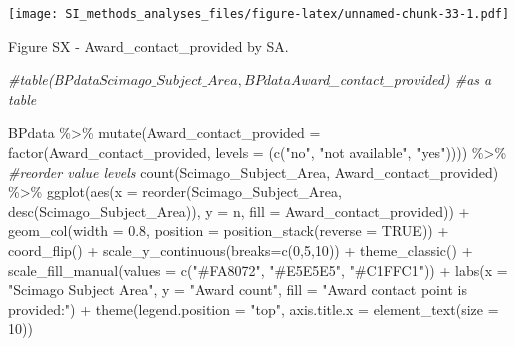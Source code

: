 \documentclass[
]{article}
\newenvironment{Shaded}{\begin{snugshade}}{\end{snugshade}}
\newcommand{\AttributeTok}[1]{\textcolor[rgb]{0.77,0.63,0.00}{#1}}
\newcommand{\CommentTok}[1]{\textcolor[rgb]{0.56,0.35,0.01}{\textit{#1}}}
\newcommand{\ConstantTok}[1]{\textcolor[rgb]{0.00,0.00,0.00}{#1}}
\newcommand{\DecValTok}[1]{\textcolor[rgb]{0.00,0.00,0.81}{#1}}
\newcommand{\FloatTok}[1]{\textcolor[rgb]{0.00,0.00,0.81}{#1}}
\newcommand{\FunctionTok}[1]{\textcolor[rgb]{0.00,0.00,0.00}{#1}}
\newcommand{\NormalTok}[1]{#1}
\newcommand{\SpecialCharTok}[1]{\textcolor[rgb]{0.00,0.00,0.00}{#1}}
\newcommand{\StringTok}[1]{\textcolor[rgb]{0.31,0.60,0.02}{#1}}
\begin{document}
\texttt{[image: SI\_methods\_analyses\_files/figure-latex/unnamed-chunk-33-1.pdf]}

Figure SX - Award\_contact\_provided by SA.

\begin{Shaded}
\begin{Highlighting}[]
\CommentTok{\#table(BPdata$Scimago\_Subject\_Area, BPdata$Award\_contact\_provided) \#as a table}

\NormalTok{BPdata }\SpecialCharTok{\%\textgreater{}\%} 
    \FunctionTok{mutate}\NormalTok{(}\AttributeTok{Award\_contact\_provided =} \FunctionTok{factor}\NormalTok{(Award\_contact\_provided, }\AttributeTok{levels =}\NormalTok{ (}\FunctionTok{c}\NormalTok{(}\StringTok{"no"}\NormalTok{, }\StringTok{"not available"}\NormalTok{, }\StringTok{"yes"}\NormalTok{)))) }\SpecialCharTok{\%\textgreater{}\%} \CommentTok{\#reorder value levels}
    \FunctionTok{count}\NormalTok{(Scimago\_Subject\_Area, Award\_contact\_provided) }\SpecialCharTok{\%\textgreater{}\%}
    \FunctionTok{ggplot}\NormalTok{(}\FunctionTok{aes}\NormalTok{(}\AttributeTok{x =} \FunctionTok{reorder}\NormalTok{(Scimago\_Subject\_Area, }\FunctionTok{desc}\NormalTok{(Scimago\_Subject\_Area)), }\AttributeTok{y =}\NormalTok{ n, }\AttributeTok{fill =}\NormalTok{ Award\_contact\_provided)) }\SpecialCharTok{+} 
    \FunctionTok{geom\_col}\NormalTok{(}\AttributeTok{width =} \FloatTok{0.8}\NormalTok{, }\AttributeTok{position =} \FunctionTok{position\_stack}\NormalTok{(}\AttributeTok{reverse =} \ConstantTok{TRUE}\NormalTok{)) }\SpecialCharTok{+}
    \FunctionTok{coord\_flip}\NormalTok{() }\SpecialCharTok{+}
    \FunctionTok{scale\_y\_continuous}\NormalTok{(}\AttributeTok{breaks=}\FunctionTok{c}\NormalTok{(}\DecValTok{0}\NormalTok{,}\DecValTok{5}\NormalTok{,}\DecValTok{10}\NormalTok{)) }\SpecialCharTok{+}
    \FunctionTok{theme\_classic}\NormalTok{() }\SpecialCharTok{+} 
    \FunctionTok{scale\_fill\_manual}\NormalTok{(}\AttributeTok{values =} \FunctionTok{c}\NormalTok{(}\StringTok{"\#FA8072"}\NormalTok{, }\StringTok{"\#E5E5E5"}\NormalTok{, }\StringTok{"\#C1FFC1"}\NormalTok{)) }\SpecialCharTok{+}
    \FunctionTok{labs}\NormalTok{(}\AttributeTok{x =} \StringTok{"Scimago Subject Area"}\NormalTok{, }\AttributeTok{y =} \StringTok{"Award count"}\NormalTok{, }\AttributeTok{fill =} \StringTok{"Award contact point is provided:"}\NormalTok{) }\SpecialCharTok{+} 
    \FunctionTok{theme}\NormalTok{(}\AttributeTok{legend.position =} \StringTok{"top"}\NormalTok{, }\AttributeTok{axis.title.x =} \FunctionTok{element\_text}\NormalTok{(}\AttributeTok{size =} \DecValTok{10}\NormalTok{))}
\end{Highlighting}
\end{Shaded}
\end{document}

